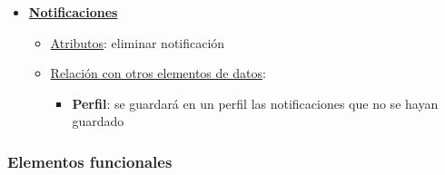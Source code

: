 \documentclass[12pt]{article}
\begin{document}
\begin{itemize}
\begin{itemize}
\begin{itemize}
\end{itemize}
\end{itemize}
\item \textbf{\underline{Notificaciones}}
\begin{itemize}
\item \underline{Atributos}: eliminar notificación
\item \underline{Relación con otros elementos de datos}: 
\begin{itemize}
\item \textbf{Perfil}: se guardará en un perfil las notificaciones que no se hayan guardado
\end{itemize}
\end{itemize}
\end{itemize}

\subsubsection{Elementos funcionales}
\end{document}
